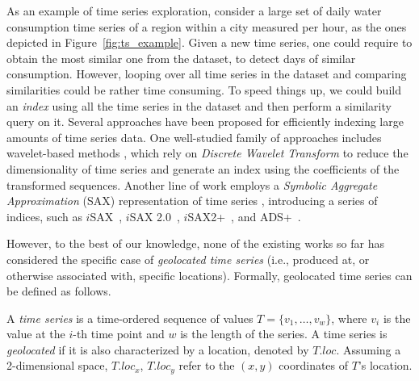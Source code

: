 As an example of time series exploration, consider a large set of daily water consumption time series of a region within a city measured per hour, as the ones depicted in Figure~\ref{fig:ts_example}. Given a new time series, one could require to obtain the most similar one from the dataset, to detect days of similar consumption. However, looping over all time series in the dataset and comparing similarities could be rather time consuming. To speed things up, we could build an \textit{index} using all the time series in the dataset and then perform a similarity query on it. Several approaches have been proposed for efficiently indexing large amounts of time series data. One well-studied family of approaches includes wavelet-based methods \cite{chan1999icde}, which rely on \textit{Discrete Wavelet Transform} \cite{graps1995cse} to reduce the dimensionality of time series and generate an index using the coefficients of the transformed sequences. Another line of work employs a \textit{Symbolic Aggregate Approximation} (SAX) representation of time series \cite{jessica2007dmkd}, introducing a series of indices, such as $i$SAX~\cite{shieh2008kdd}, $i$SAX 2.0~\cite{camerra2010icdm}, $i$SAX2+~\cite{camerra2014kais}, and ADS+~\cite{zoumpatianos2014sigmod}.

However, to the best of our knowledge, none of the existing works so far has considered the specific case of \textit{geolocated time series} (i.e., produced at, or otherwise associated with, specific locations). Formally, geolocated time series can be defined as follows.

\begin{mydefinition} 
A {\em time series} is a time-ordered sequence of values $T = \{v_1, \ldots, v_w\}$, where $v_i$ is the value at the $i$-th time point and $w$ is the length of the series. A time series is \textit{geolocated} if it is also characterized by a location, denoted by $T.loc$. Assuming a 2-dimensional space, $T.loc_x$, $T.loc_y$ refer to the $(x,y)$ coordinates of $T$'s location.
\end{mydefinition}

